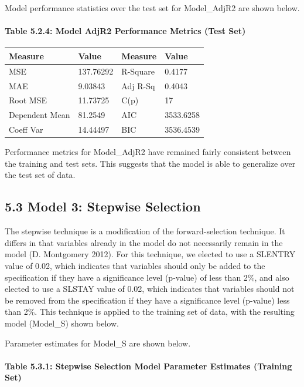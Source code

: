 \documentclass[]{article}
\let\oldparagraph\paragraph
\renewcommand{\paragraph}[1]{\oldparagraph{#1}\mbox{}}
\begin{document}
Model performance statistics over the test set for Model\_AdjR2 are
shown below.

\paragraph{Table 5.2.4: Model AdjR2 Performance Metrics (Test
Set)}\label{table-5.2.4-model-adjr2-performance-metrics-test-set}

\begin{longtable}[]{@{}llll@{}}
\toprule
Measure & Value & Measure & Value\tabularnewline
\midrule
\endhead
MSE & 137.76292 & R-Square & 0.4177\tabularnewline
MAE & 9.03843 & Adj R-Sq & 0.4043\tabularnewline
Root MSE & 11.73725 & C(p) & 17\tabularnewline
Dependent Mean & 81.2549 & AIC & 3533.6258\tabularnewline
Coeff Var & 14.44497 & BIC & 3536.4539\tabularnewline
\bottomrule
\end{longtable}

Performance metrics for Model\_AdjR2 have remained fairly consistent
between the training and test sets. This suggests that the model is able
to generalize over the test set of data.

\subsection{5.3 Model 3: Stepwise
Selection}\label{model-3-stepwise-selection}

The stepwise technique is a modification of the forward-selection
technique. It differs in that variables already in the model do not
necessarily remain in the model (D. Montgomery 2012). For this
technique, we elected to use a SLENTRY value of 0.02, which indicates
that variables should only be added to the specification if they have a
significance level (p-value) of less than 2\%, and also elected to use a
SLSTAY value of 0.02, which indicates that variables should not be
removed from the specification if they have a significance level
(p-value) less than 2\%. This technique is applied to the training set
of data, with the resulting model (Model\_S) shown below.

Parameter estimates for Model\_S are shown below.

\paragraph{Table 5.3.1: Stepwise Selection Model Parameter Estimates
(Training
Set)}\label{table-5.3.1-stepwise-selection-model-parameter-estimates-training-set}
\end{document}
